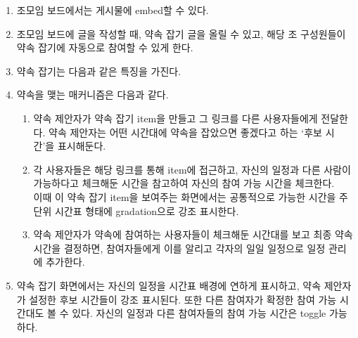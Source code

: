 \documentclass[a4paper,titlepage]{article}
\begin{document}
\begin{funcreq}
\begin{enumerate}
		\item 조모임 보드에서는 게시물에 embed할 수 있다.
		\item 조모임 보드에 글을 작성할 때, 약속 잡기 글을 올릴 수 있고, 해당 조 구성원들이 약속 잡기에 자동으로 참여할 수 있게 한다.
		\item 약속 잡기는 다음과 같은 특징을 가진다.
		\item 약속을 맺는 매커니즘은 다음과 같다.\\
		\begin{enumerate}
			\item 약속 제안자가 약속 잡기 item을 만들고 그 링크를 다른 사용자들에게 전달한다.
			약속 제안자는 어떤 시간대에 약속을 잡았으면 좋겠다고 하는 `후보 시간'을 표시해둔다.
			\item 각 사용자들은 해당 링크를 통해 item에 접근하고, 자신의 일정과 다른 사람이 가능하다고 체크해둔 시간을 참고하여 자신의 참여 가능 시간을 체크한다.\\
			이때 이 약속 잡기 item을 보여주는 화면에서는 공통적으로 가능한 시간을 주 단위 시간표 형태에 gradation으로 강조 표시한다.
			\item 약속 제안자가 약속에 참여하는 사용자들이 체크해둔 시간대를 보고 최종 약속 시간을 결정하면, 참여자들에게 이를 알리고 각자의 일일 일정으로 일정 관리에 추가한다. 
		\end{enumerate}
		\item 약속 잡기 화면에서는 자신의 일정을 시간표 배경에 연하게 표시하고, 약속 제안자가 설정한 후보 시간들이 강조 표시된다.
		또한 다른 참여자가 확정한 참여 가능 시간대도 볼 수 있다. 자신의 일정과 다른 참여자들의 참여 가능 시간은 toggle 가능하다.
	\end{enumerate}
\end{funcreq}
\end{document}
